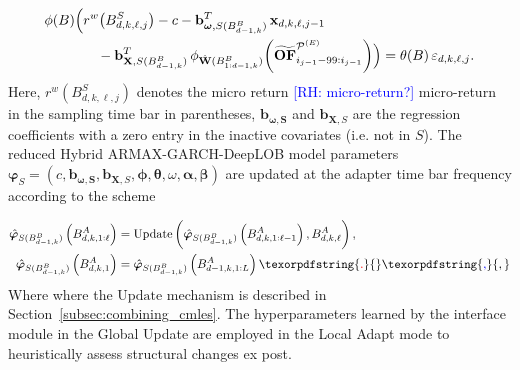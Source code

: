 \documentclass[10pt,a4paper,oneside]{article}
\newcommand{\rh}[1]{\textcolor{blue}{\textsf{[RH: #1]}}}
\providecommand{\DIFaddtex}[1]{{\protect\color{blue} \sf #1}} %
\providecommand{\DIFdeltex}[1]{{\protect\color{red} \scriptsize #1}} %
\providecommand{\DIFaddbegin}{} %
\providecommand{\DIFaddend}{} %
\providecommand{\DIFdelbegin}{} %
\providecommand{\DIFdelend}{} %
\providecommand{\DIFadd}[1]{\texorpdfstring{\DIFaddtex{#1}}{#1}} %
\providecommand{\DIFdel}[1]{\texorpdfstring{\DIFdeltex{#1}}{}} %
\newcommand{\DIFscaledelfig}{0.5}
\newlength{\DIFdelgraphicswidth} %
\newlength{\DIFdelgraphicsheight} %
\newcommand{\DIFaddincludegraphics}[2][]{{\color{blue}\fbox{\DIFOincludegraphics[#1]{#2}}}} %
\newcommand{\DIFdelincludegraphics}[2][]{%
\sbox{\DIFdelgraphicsbox}{\DIFOincludegraphics[#1]{#2}}%
\settoboxwidth{\DIFdelgraphicswidth}{\DIFdelgraphicsbox} %
\settoboxtotalheight{\DIFdelgraphicsheight}{\DIFdelgraphicsbox} %
\scalebox{\DIFscaledelfig}{%
\parbox[b]{\DIFdelgraphicswidth}{\usebox{\DIFdelgraphicsbox}\\[-\baselineskip] \rule{\DIFdelgraphicswidth}{0em}}\llap{\resizebox{\DIFdelgraphicswidth}{\DIFdelgraphicsheight}{%
\setlength{\unitlength}{\DIFdelgraphicswidth}%
\begin{picture}(1,1)%
\thicklines\linethickness{2pt} %
{\color[rgb]{1,0,0}\put(0,0){\framebox(1,1){}}}%
{\color[rgb]{1,0,0}\put(0,0){\line( 1,1){1}}}%
{\color[rgb]{1,0,0}\put(0,1){\line(1,-1){1}}}%
\end{picture}%
}\hspace*{3pt}}} %
} %
\DeclareRobustCommand{\DIFaddbegin}{\DIFOaddbegin \let\includegraphics\DIFaddincludegraphics} %
\DeclareRobustCommand{\DIFaddend}{\DIFOaddend \let\includegraphics\DIFOincludegraphics} %
\DeclareRobustCommand{\DIFdelbegin}{\DIFOdelbegin \let\includegraphics\DIFdelincludegraphics} %
\DeclareRobustCommand{\DIFdelend}{\DIFOaddend \let\includegraphics\DIFOincludegraphics} %
\begin{document}
\begin{align*}
\phi(B)\Bigl(&r^w\bigl(B^{S}_{d,k,\ell,j}\bigr) - c 
    - \mathbf{b}_{\boldsymbol{\omega}, S(B^B_{d-1,k})}^{T}\,\mathbf{x}_{d,k,\ell,j-1} \notag\\
    &\quad - \mathbf{b}^T_{\mathbf{X}, S(B^B_{d-1,k})}\,
      \phi_{\hat{\mathbf{W}}(B^B_{1:d-1,k})}\!\left(\widetilde{\mathbf{OF}}^{\mathcal{P}^{(E)}}_{i_{j-1}-99:i_{j-1}}\right)
\Bigr) = \theta(B)\,\varepsilon_{d,k,\ell,j}.
\end{align*}
Here, $r^w(B^{S}_{d,k,\ell,j})$ denotes the \DIFdelbegin \DIFdel{micro return \rh{micro-return?} }\DIFdelend \DIFaddbegin \DIFadd{micro-return }\DIFaddend in the sampling time bar in parentheses, $\mathbf{b}_{\boldsymbol{\omega, S}}$ and $\mathbf{b}_{\mathbf{X}, S}$ are the regression coefficients with a zero entry in the inactive covariates (i.e. not in $S$). The reduced Hybrid ARMAX-GARCH-DeepLOB model parameters $\boldsymbol{\varphi}_{S} = (c, \mathbf{b}_{\boldsymbol{\omega, S}}, \mathbf{b}_{\mathbf{X}, S}, \boldsymbol{\phi}, \boldsymbol{\theta}, \omega, \boldsymbol{\alpha}, \boldsymbol{\beta})$ are updated at the adapter time bar frequency according to the scheme

\begin{align*}
    \hat{\boldsymbol{\varphi}}_{S(B^B_{d-1,k})}\left(B^A_{d,k,1:\ell} \right) &= \mathrm{Update}\left(\hat{\boldsymbol{\varphi}}_{S(B^B_{d-1,k})}\left(B^A_{d,k,1:\ell-1} \right), B^A_{d,k,\ell}\right),\\
    \hat{\boldsymbol{\varphi}}_{S(B^B_{d-1,k})}\left(B^A_{d,k,1} \right) &= \hat{\boldsymbol{\varphi}}_{S(B^B_{d-1,k})}\left(B^A_{d - 1,k,1:L} \right)\DIFdelbegin \DIFdel{.
}\DIFdelend \DIFaddbegin \DIFadd{,
}\DIFaddend \end{align*}
\DIFdelbegin \DIFdel{Where }\DIFdelend \DIFaddbegin \DIFadd{where }\DIFaddend the $\mathrm{Update}$ mechanism is described in Section~\ref{subsec:combining_cmles}. The hyperparameters learned by the interface module in the Global Update are employed in the Local Adapt mode to heuristically assess structural changes ex post.


\end{document}
